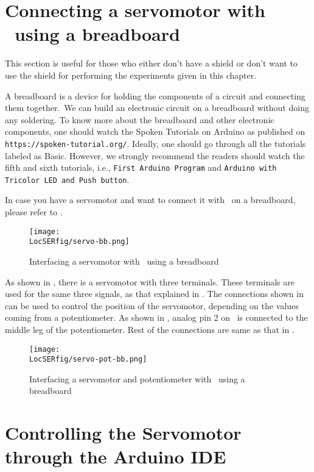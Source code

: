 \section{Connecting a servomotor with \arduino\ using a breadboard}
This section is useful for those who either don't have a shield or don't want to use the shield
for performing the experiments given in this chapter. 

A breadboard is a device for holding the components of a circuit and connecting 
them together. We can build an electronic circuit on a breadboard without doing any 
soldering. To know more about the breadboard and other electronic components, 
one should watch the Spoken Tutorials on Arduino as published on
  {\tt https://spoken-tutorial.org/}. Ideally, one should go through all the
tutorials labeled as Basic. However, we strongly recommend the readers should
watch the fifth and sixth tutorials, i.e., {\tt First Arduino Program} and 
  {\tt Arduino with Tricolor LED and Push button}.

In case you have a servomotor and want to connect it with \arduino\ on a breadboard, 
please refer to . 
\begin{figure}
  \centering
  \texttt{[image: \\LocSERfig/servo-bb.png]}
  \caption{Interfacing a servomotor with \arduino\ using a breadboard}
  \label{fig:servo-bread}
\end{figure}
As shown in , there is a servomotor with three 
terminals. These terminals are used for the same three signals, as that explained 
in . The connections shown in  can 
be used to control the position of the servomotor, depending on the 
values coming from a potentiometer. As shown in , 
analog pin 2 on \arduino\ is connected to the middle leg of the 
potentiometer. Rest of the connections are same as that in . 

\begin{figure}
  \centering
  \texttt{[image: \\LocSERfig/servo-pot-bb.png]}
  \caption{Interfacing a servomotor and potentiometer with \arduino\ using a breadboard}
  \label{fig:servo-pot-bread}
\end{figure}

\section{Controlling the Servomotor through the Arduino IDE}
